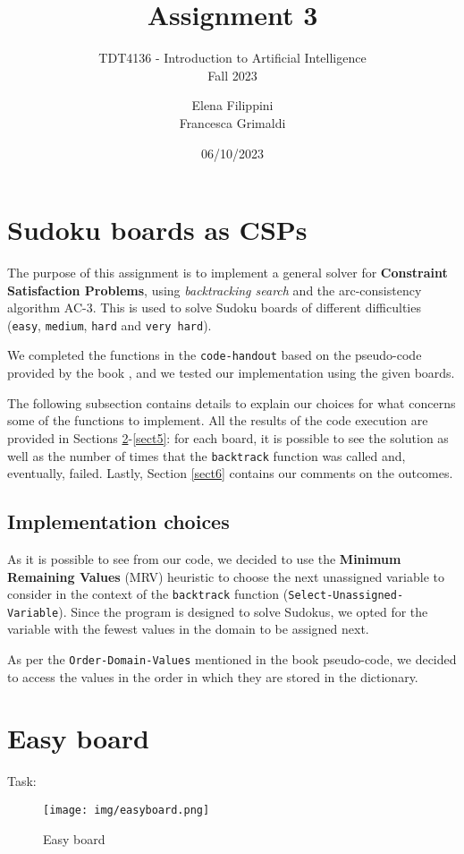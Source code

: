 \documentclass{article}
\title{%
    \huge Assignment 3}
\subtitle{%
    TDT4136 - Introduction to Artificial Intelligence \\
    Fall 2023
    }
\author{%
  Elena Filippini\\
  Francesca Grimaldi
}
\date{06/10/2023}
\begin{document}
\maketitle




\section{Sudoku boards as CSPs}

The purpose of this assignment is to implement a general solver for \textbf{Constraint Satisfaction Problems}, using \textit{backtracking search} and the arc-consistency algorithm AC-3. This is used to solve Sudoku boards of different difficulties (\texttt{easy}, \texttt{medium}, \texttt{hard} and \texttt{very hard}).

We completed the functions in the \texttt{code-handout} \cite{code} based on the pseudo-code provided by the book \cite{ai}, and we tested our implementation using the given boards.

The following subsection contains details to explain our choices for what concerns some of the functions to implement. All the results of the code execution are provided in Sections \ref{sect2}-\ref{sect5}: for each board, it is possible to see the solution as well as the number of times that the \texttt{backtrack} function was called and, eventually, failed. Lastly, Section \ref{sect6} contains our comments on the outcomes.

\subsection{Implementation choices}
As it is possible to see from our code, we decided to use the \textbf{Minimum Remaining Values} (MRV) heuristic to choose the next unassigned variable to consider in the context of the \texttt{backtrack} function (\texttt{Select-Unassigned-Variable}).
Since the program is designed to solve Sudokus, we opted for the variable with the fewest values in the domain to be assigned next.

As per the \texttt{Order-Domain-Values} mentioned in the book pseudo-code, we decided to access the values in the order in which they are stored in the dictionary.

\newpage
\section{Easy board}\label{sect2}
Task:
\begin{figure}[H]
\centering
\texttt{[image: img/easyboard.png]}
\caption{Easy board}
\label{fig:easyboard}
\end{figure}
\end{document}
